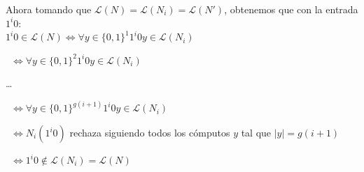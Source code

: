 \documentclass{article}
\begin{document}
\begin{flushleft}
  Ahora tomando que $\mathcal{L}(N) = \mathcal{L}(N_i) = \mathcal{L}(N')$, obtenemos que con la entrada $1^i 0$:
  \\[0.5em]

  $1^i 0 \in \mathcal{L}(N) \iff \forall y \in \{0,1\}^1 1^i 0 y \in \mathcal{L}(N_i)$

  \qquad \qquad \quad \ $\iff \forall y \in \{0,1\}^2 1^i 0 y \in \mathcal{L}(N_i)$

  \qquad \qquad \qquad \dots

  \qquad \qquad \quad \ $\iff \forall y \in \{0,1\}^{g(i+1)} 1^i 0 y \in \mathcal{L}(N_i)$

  \qquad \qquad \quad \ $\iff N_i(1^i0)$ rechaza siguiendo todos los cómputos $y$ tal que $|y| = g(i+1)$

  \qquad \qquad \quad \ $\iff 1^i0 \not\in \mathcal{L}(N_i) = \mathcal{L}(N)$
\end{flushleft}
\end{document}
